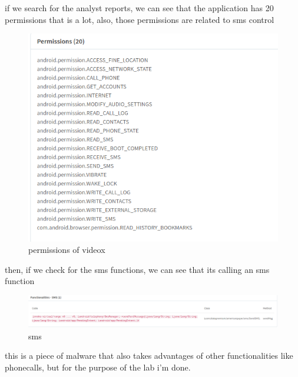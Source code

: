 \documentclass[10pt,a4paper]{article} %
\begin{document}
        if we search for the analyst reports, we can see that the application
        has 20 permissions that is a lot, also, those permissions are related
        to sms control
        \begin{figure}[h!]
            \centering
            \includegraphics[width=0.8\linewidth]{videoxper.png}
            \caption{permissions of videox}
            \label{pervidx}
        \end{figure}
        then, if we check for the sms functions, we can see that its calling an sms function
        \begin{figure}[h!]
            \centering
            \includegraphics[width=0.8\linewidth]{sms.png}
            \caption{sms}
            \label{sms}
        \end{figure}
        this is a piece of malware that also takes advantages of other
        functionalities like phonecalls, but for the purpose of the lab i'm
        done.
\end{document}
